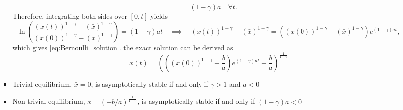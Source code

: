\documentclass[12pt,a4paper]{article}
\begin{document}
\begin{itemize}
\begin{itemize}
\begin{itemize}
{\begin{equation}
          = (1-\gamma)a
          \quad \forall t.
        \end{equation}
        Therefore, integrating both sides over $[0,t]$ yields
        \begin{equation}\nonumber%
          \ln \left(\frac{(x(t))^{1-\gamma} - (\bar{x})^{1-\gamma}}{(x(0))^{1-\gamma} - (\bar{x})^{1-\gamma}}\right)
          = (1-\gamma)at
          \quad\implies\quad
          (x(t))^{1-\gamma} - (\bar{x})^{1-\gamma}
          = \left((x(0))^{1-\gamma} - (\bar{x})^{1-\gamma}\right)e^{(1-\gamma)at},
        \end{equation}
        which gives \eqref{eq:Bernoulli_solution}.
      }
      the exact solution can be derived as
      \begin{equation}\label{eq:Bernoulli_solution}%
        x(t) = \left(\left((x(0))^{1-\gamma} + \frac{b}{a}\right)e^{(1-\gamma)at} - \frac{b}{a}\right)^{\frac{1}{1-\gamma}}
      \end{equation}
    \item Trivial equilibrium, $\bar{x}=0$, is asymptotically stable if and only if $\gamma >1$ and $a<0$
    \item Non-trivial equilibrium, $\bar{x}=(-b/a)^{\frac{1}{1-\gamma}}$, is asymptotically stable if and only if $(1-\gamma)a<0$
    \end{itemize}
  \end{itemize}

\clearpage


\end{itemize}
\end{document}
